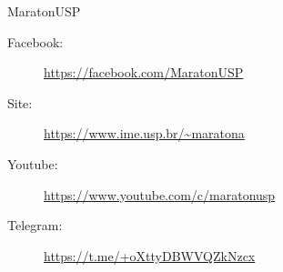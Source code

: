 \begin{subsecao}{MaratonUSP}
\begin{description}
\item[Facebook:] \url{https://facebook.com/MaratonUSP}
\item[Site:] \url{https://www.ime.usp.br/~maratona}
\item[Youtube:] \url{https://www.youtube.com/c/maratonusp}
\item[Telegram:] \url{https://t.me/+oXttyDBWVQZkNzcx}
\end{description}

\end{subsecao}
